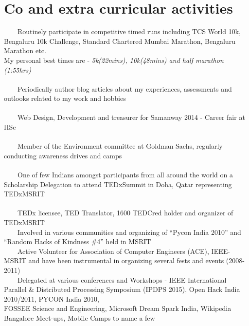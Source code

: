 \documentclass[a4paper,10pt]{article} %
\newcommand{\tabitem}{~~\llap{\textbullet}~~}
\begin{document}

\section{Co and extra curricular activities}
\tabitem Routinely participate in competitive timed runs including TCS World 10k, Bengaluru 10k Challenge, Standard Chartered Mumbai Marathon, Bengaluru Marathon etc. \\ {\footnotesize My personal best times are - \textit{5k(22mins), \space 10k(48mins) and half marathon (1:55hrs)} }\\
\\
\tabitem Periodically author blog articles about my experiences, assessments and outlooks related to my work and hobbies \\
\\
\tabitem Web Design, Development and treasurer for Samanway 2014 - Career fair at IISc \\
\\ 
\tabitem Member of the Environment committee at Goldman Sachs, regularly conducting awareness drives and camps \\
\\
\tabitem One of few Indians amongst participants from all around the world on a Scholarship Delegation to attend TEDxSummit in Doha, Qatar representing TEDxMSRIT \\
\\
\tabitem TEDx licensee, TED Translator, 1600 TEDCred holder and organizer of TEDxMSRIT \\
\tabitem Involved in various communities and organizing of “Pycon India 2010” and “Random Hacks of Kindness \#4” held in MSRIT\\
\tabitem Active Volunteer for Association of Computer Engineers (ACE), IEEE-MSRIT and have been instrumental in organizing several fests and events (2008-2011)\\
\tabitem Delegated at various conferences and Workshops - IEEE International Parallel \& Distributed Processing Symposium (IPDPS 2015), Open Hack India 2010/2011, PYCON India 2010,\\ FOSSEE Science and Engineering, Microsoft Dream Spark India, Wikipedia Bangalore Meet-ups, Mobile Camps to name a few\\
\\
\end{document}

